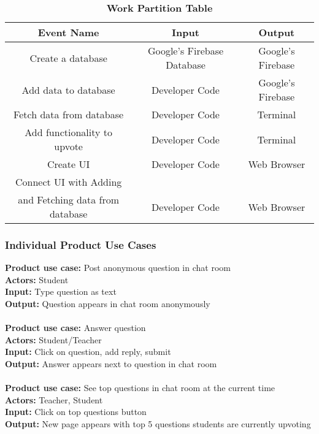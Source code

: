 \documentclass[12pt, titlepage]{article}
\begin{document}
\begin{table}[H]
\centering
\begin{tabular}{|c|c|c|} \hline
 \textbf{Event  Name} & \textbf{Input} &  \textbf{Output} \\ \hline
 Create a database & Google’s Firebase Database & Google’s Firebase  \\\hline
 Add data to database & Developer Code & Google’s Firebase \\\hline
 Fetch data from database & Developer Code & Terminal  \\\hline
 Add functionality to upvote & Developer Code & Terminal  \\\hline
 Create UI & Developer Code & Web Browser  \\\hline
 Connect UI with Adding  & & \\
 and Fetching data from database & Developer Code & Web Browser\\\hline
\end{tabular}
\caption{\bf Work Partition Table}
\label{TeamMemberRoles}
\end{table}

\subsubsection{Individual Product Use Cases}

\textbf{Product use case:} Post anonymous question in chat room 
\\
\textbf{Actors:} Student 
\\
\textbf{Input:} Type question as text
\\
\textbf{Output:} Question appears in chat room anonymously 
\\
\\
\textbf{Product use case:} Answer question
\\
\textbf{Actors:} Student/Teacher 
\\
\textbf{Input:} Click on question, add reply, submit 
\\
\textbf{Output:} Answer appears next to question in chat room 
\\
\\
\textbf{Product use case:} See top questions in chat room at the current time
\\
\textbf{Actors:} Teacher, Student
\\
\textbf{Input:} Click on top questions button 
\\
\textbf{Output:} New page appears with top 5 questions students are currently upvoting 
\end{document}
